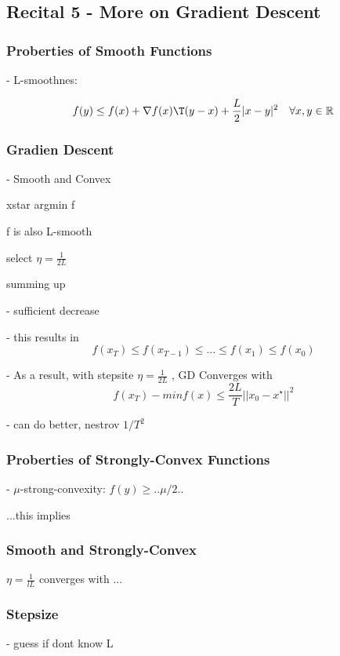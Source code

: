 \subsection{Recital  5 - More on Gradient Descent}

\subsubsection{Proberties of Smooth Functions}

- L-smoothnes:

\[f(y)\le f(x)+\nabla f(x)\T (y-x) +\frac{L}{2}|x-y|^2 \quad \forall x,y \in \mathbb{R}^{}\]

\subsubsection{Gradien Descent}

- Smooth and Convex

xstar argmin f

f is also L-smooth

select $\eta = \frac{1}{2L}$

summing up

- sufficient decrease

- this results in
$$ f(x_T)\le f(x_{T-1})\le \dots \le f(x_1)\le f(x_0)$$

- As a result, with stepsite $\eta = \frac{1}{2L}$
, GD Converges with
$$ f(x_T)-minf(x)\le \frac{2L}{T} ||x_0-x^\star||^2 $$

- can do better, nestrov $1/T^2$

\subsubsection{Proberties of Strongly-Convex Functions}

- $\mu$-strong-convexity: $f(y)\ge ..\mu/2 ..$

...this implies

\subsubsection{Smooth and Strongly-Convex}

$\eta = \frac{1}{lL}$ converges with ...


\subsubsection{Stepsize}

- guess if dont know L

